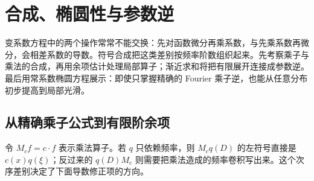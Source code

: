 \section{合成、椭圆性与参数逆}
\label{b2:sec:app-G-3}

变系数方程中的两个操作常常不能交换：先对函数微分再乘系数，与先乘系数再微分，会相差系数的导数。符号合成把这类差别按频率阶数组织起来。先考察乘子与乘法的合成，再用余项估计处理局部算子；渐近求和将把有限展开连接成参数逆。最后用常系数椭圆方程展示：即使只掌握精确的 Fourier 乘子逆，也能从任意分布初步提高到局部光滑。

\subsection{从精确乘子公式到有限阶余项}
\label{b2:subsec:G-finite-composition}

令 \(M_c f=c\cdot f\) 表示乘法算子。若 \(q\) 只依赖频率，则 \(M_cq(D)\) 的左符号直接是 \(c(x)q(\xi)\)；反过来的 \(q(D)M_c\) 则需要把乘法造成的频率卷积写出来。这个次序差别决定了下面导数修正项的方向。

